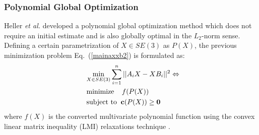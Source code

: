 \documentclass[twocolumn,10pt]{asme2ej}
\begin{document}
\subsubsection{Polynomial Global Optimization}
Heller {\it et al.} \cite{heller2014hand} developed a polynomial global optimization method which does not require an initial estimate and is also globally optimal in the $L_2$-norm sense. Defining a certain parametrization of $X \in SE(3)$ as $P(X)$, the previous minimization problem Eq.~(\ref{mainaxxb2}) is formulated as:
\begin{equation}
\begin{split}
&\underset{X \in SE(3)}{\text{min}}\sum_{i=1}^n ||A_{i}X - XB_{i}||^2 \Leftrightarrow \\
&\text{minimize} \; \; \; \; f(P(X)) \\
\; \; &\text{subject to} \; \; {\bf c}(P(X)) \geq {\bf 0} 
\end{split}
\label{LMI}
\end{equation}
where $f(X)$ is the converted multivariate polynomial function using the convex linear matrix inequality (LMI) relaxations technique \cite{lepetit2009epnp}. 
\end{document}
